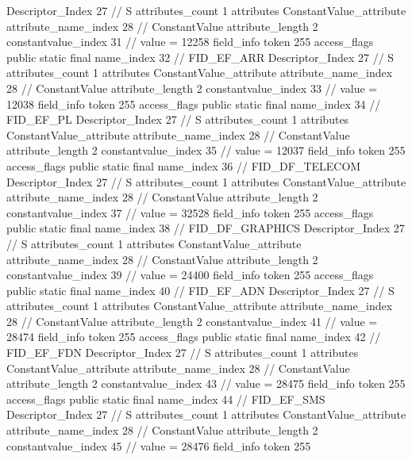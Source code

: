 {{{{{				Descriptor_Index	27		// S
				attributes_count	1
				attributes {
				ConstantValue_attribute {
					attribute_name_index	28		// ConstantValue
					attribute_length	2
					constantvalue_index	31		// value = 12258
				}
				}
			}
			field_info {
				token	255
				access_flags	public static final
				name_index	32		// FID_EF_ARR
				Descriptor_Index	27		// S
				attributes_count	1
				attributes {
				ConstantValue_attribute {
					attribute_name_index	28		// ConstantValue
					attribute_length	2
					constantvalue_index	33		// value = 12038
				}
				}
			}
			field_info {
				token	255
				access_flags	public static final
				name_index	34		// FID_EF_PL
				Descriptor_Index	27		// S
				attributes_count	1
				attributes {
				ConstantValue_attribute {
					attribute_name_index	28		// ConstantValue
					attribute_length	2
					constantvalue_index	35		// value = 12037
				}
				}
			}
			field_info {
				token	255
				access_flags	public static final
				name_index	36		// FID_DF_TELECOM
				Descriptor_Index	27		// S
				attributes_count	1
				attributes {
				ConstantValue_attribute {
					attribute_name_index	28		// ConstantValue
					attribute_length	2
					constantvalue_index	37		// value = 32528
				}
				}
			}
			field_info {
				token	255
				access_flags	public static final
				name_index	38		// FID_DF_GRAPHICS
				Descriptor_Index	27		// S
				attributes_count	1
				attributes {
				ConstantValue_attribute {
					attribute_name_index	28		// ConstantValue
					attribute_length	2
					constantvalue_index	39		// value = 24400
				}
				}
			}
			field_info {
				token	255
				access_flags	public static final
				name_index	40		// FID_EF_ADN
				Descriptor_Index	27		// S
				attributes_count	1
				attributes {
				ConstantValue_attribute {
					attribute_name_index	28		// ConstantValue
					attribute_length	2
					constantvalue_index	41		// value = 28474
				}
				}
			}
			field_info {
				token	255
				access_flags	public static final
				name_index	42		// FID_EF_FDN
				Descriptor_Index	27		// S
				attributes_count	1
				attributes {
				ConstantValue_attribute {
					attribute_name_index	28		// ConstantValue
					attribute_length	2
					constantvalue_index	43		// value = 28475
				}
				}
			}
			field_info {
				token	255
				access_flags	public static final
				name_index	44		// FID_EF_SMS
				Descriptor_Index	27		// S
				attributes_count	1
				attributes {
				ConstantValue_attribute {
					attribute_name_index	28		// ConstantValue
					attribute_length	2
					constantvalue_index	45		// value = 28476
				}
				}
			}
			field_info {
				token	255
}}}}}
